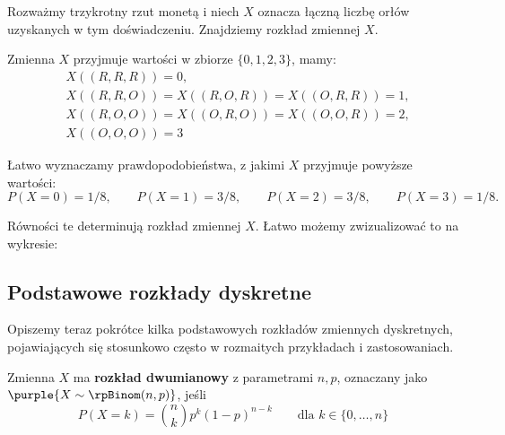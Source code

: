 \begin{example}
    Rozważmy trzykrotny rzut monetą i niech $X$ oznacza łączną liczbę orłów uzyskanych w tym doświadczeniu. Znajdziemy rozkład zmiennej $X$.

    Zmienna $X$ przyjmuje wartości w zbiorze $\{0, 1, 2, 3\}$, mamy:
    \begin{align*}
        &X((R, R, R)) = 0, \\
        &X((R, R, O)) = X((R, O, R)) = X((O, R, R)) = 1, \\
        &X((R, O, O)) = X((O, R, O)) = X((O, O, R)) = 2, \\
        &X((O, O, O)) = 3
    \end{align*}

    Łatwo wyznaczamy prawdopodobieństwa, z jakimi $X$ przyjmuje powyższe wartości:
    $$P(X = 0) = 1/8, \qquad P(X = 1) = 3/8, \qquad P(X = 2) = 3/8, \qquad P(X = 3) = 1/8.$$

    Równości te determinują rozkład zmiennej $X$. Łatwo możemy zwizualizować to na wykresie:
    \begin{center}
    \end{center}
\end{example}

\subsection{Podstawowe rozkłady dyskretne}

Opiszemy teraz pokrótce kilka podstawowych rozkładów zmiennych dyskretnych, pojawiających się stosunkowo często w rozmaitych przykładach i zastosowaniach.
\bigskip

Zmienna $X$ ma \textbf{rozkład dwumianowy} z parametrami $n,p$, oznaczany jako $\purple{X \sim \rpBinom(n,p)}$, jeśli 
$$P(X = k) = \binom{n}{k}p^k(1-p)^{n-k} \qquad \text{dla } k \in \{0,\ldots,n\}$$

